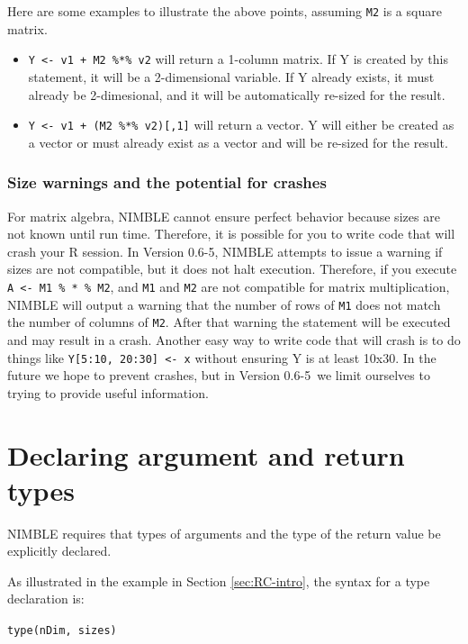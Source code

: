 \documentclass[12pt,oneside]{book}\usepackage[]{graphicx}\usepackage[]{color}
\def\cd#1{\texttt{#1}}
\newcommand{\ver}{0.6-5}
\begin{document}
Here are some examples to illustrate the above points, assuming \cd{M2} is
a square matrix.

\begin{itemize}
\item \cd{Y <- v1 + M2 \%*\% v2} will
  return a 1-column matrix.  If Y is created by this statement, it
  will be a 2-dimensional variable.  If Y already exists, it must
  already be 2-dimesional, and it will be automatically re-sized for
  the result.
\item \cd{Y <- v1 + (M2 \%*\% v2)[,1]} will return a vector.  Y
  will either be created as a vector or must already exist as a vector
  and will be re-sized for the result.
\end{itemize}

\subsubsection{Size warnings and the potential for crashes}
\label{sec:size-warn-potent}

For matrix algebra, NIMBLE cannot ensure perfect behavior because
sizes are not known until run time.  Therefore, it is possible for you
to write code that will crash your R session.  In Version \ver, NIMBLE
attempts to issue a warning if sizes are not compatible, but it does not
halt execution.  Therefore, if you execute \cd{A <- M1 \% * \%
  M2}, and \cd{M1} and \cd{M2} are not compatible for matrix multiplication,
NIMBLE will output a warning that the number of rows of \cd{M1} does not
match the number of columns of \cd{M2}.  After that warning the statement
will be executed and may result in a crash.  Another easy way to write
code that will crash is to do things like \cd{Y[5:10, 20:30] <-
  x} without ensuring Y is at least 10x30.  In the future we hope to
prevent crashes, but in Version \ver\ we limit ourselves to trying to provide
useful information.



\section{Declaring argument and return types}
\label{sec:decl-argum-return}

NIMBLE requires that types of arguments and the type of the return value be
explicitly declared.

As illustrated in the example in Section \ref{sec:RC-intro},  the
syntax for a type declaration is:

 \cd{type(nDim, sizes)}
 
\end{document}
